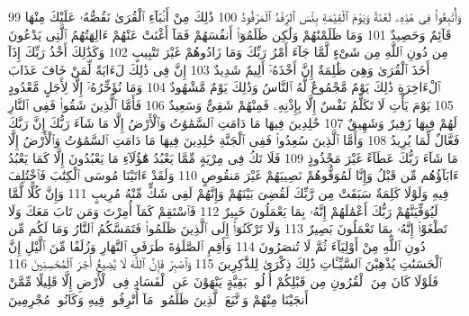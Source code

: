 {\tiny\colorbox{cl_aya}{99}} وَأُتْبِعُوا۟ فِى هَٰذِهِۦ لَعْنَةً وَيَوْمَ ٱلْقِيَٰمَةِ بِئْسَ ٱلرِّفْدُ ٱلْمَرْفُودُ
{\tiny\colorbox{cl_aya}{100}} ذَٰلِكَ مِنْ أَنۢبَآءِ ٱلْقُرَىٰ نَقُصُّهُۥ عَلَيْكَ مِنْهَا قَآئِمٌ وَحَصِيدٌ
{\tiny\colorbox{cl_aya}{101}} وَمَا ظَلَمْنَٰهُمْ وَلَٰكِن ظَلَمُوٓا۟ أَنفُسَهُمْ فَمَآ أَغْنَتْ عَنْهُمْ ءَالِهَتُهُمُ ٱلَّتِى يَدْعُونَ مِن دُونِ ٱللَّهِ مِن شَىْءٍ لَّمَّا جَآءَ أَمْرُ رَبِّكَ وَمَا زَادُوهُمْ غَيْرَ تَتْبِيبٍ
{\tiny\colorbox{cl_aya}{102}} وَكَذَٰلِكَ أَخْذُ رَبِّكَ إِذَآ أَخَذَ ٱلْقُرَىٰ وَهِىَ ظَٰلِمَةٌ إِنَّ أَخْذَهُۥٓ أَلِيمٌ شَدِيدٌ
{\tiny\colorbox{cl_aya}{103}} إِنَّ فِى ذَٰلِكَ لَءَايَةً لِّمَنْ خَافَ عَذَابَ ٱلْءَاخِرَةِ ذَٰلِكَ يَوْمٌ مَّجْمُوعٌ لَّهُ ٱلنَّاسُ وَذَٰلِكَ يَوْمٌ مَّشْهُودٌ
{\tiny\colorbox{cl_aya}{104}} وَمَا نُؤَخِّرُهُۥٓ إِلَّا لِأَجَلٍ مَّعْدُودٍ
{\tiny\colorbox{cl_aya}{105}} يَوْمَ يَأْتِ لَا تَكَلَّمُ نَفْسٌ إِلَّا بِإِذْنِهِۦ فَمِنْهُمْ شَقِىٌّ وَسَعِيدٌ
{\tiny\colorbox{cl_aya}{106}} فَأَمَّا ٱلَّذِينَ شَقُوا۟ فَفِى ٱلنَّارِ لَهُمْ فِيهَا زَفِيرٌ وَشَهِيقٌ
{\tiny\colorbox{cl_aya}{107}} خَٰلِدِينَ فِيهَا مَا دَامَتِ ٱلسَّمَٰوَٰتُ وَٱلْأَرْضُ إِلَّا مَا شَآءَ رَبُّكَ إِنَّ رَبَّكَ فَعَّالٌ لِّمَا يُرِيدُ
{\tiny\colorbox{cl_aya}{108}} وَأَمَّا ٱلَّذِينَ سُعِدُوا۟ فَفِى ٱلْجَنَّةِ خَٰلِدِينَ فِيهَا مَا دَامَتِ ٱلسَّمَٰوَٰتُ وَٱلْأَرْضُ إِلَّا مَا شَآءَ رَبُّكَ عَطَآءً غَيْرَ مَجْذُوذٍ
{\tiny\colorbox{cl_aya}{109}} فَلَا تَكُ فِى مِرْيَةٍ مِّمَّا يَعْبُدُ هَٰٓؤُلَآءِ مَا يَعْبُدُونَ إِلَّا كَمَا يَعْبُدُ ءَابَآؤُهُم مِّن قَبْلُ وَإِنَّا لَمُوَفُّوهُمْ نَصِيبَهُمْ غَيْرَ مَنقُوصٍ
{\tiny\colorbox{cl_aya}{110}} وَلَقَدْ ءَاتَيْنَا مُوسَى ٱلْكِتَٰبَ فَٱخْتُلِفَ فِيهِ وَلَوْلَا كَلِمَةٌ سَبَقَتْ مِن رَّبِّكَ لَقُضِىَ بَيْنَهُمْ وَإِنَّهُمْ لَفِى شَكٍّ مِّنْهُ مُرِيبٍ
{\tiny\colorbox{cl_aya}{111}} وَإِنَّ كُلًّا لَّمَّا لَيُوَفِّيَنَّهُمْ رَبُّكَ أَعْمَٰلَهُمْ إِنَّهُۥ بِمَا يَعْمَلُونَ خَبِيرٌ
{\tiny\colorbox{cl_aya}{112}} فَٱسْتَقِمْ كَمَآ أُمِرْتَ وَمَن تَابَ مَعَكَ وَلَا تَطْغَوْا۟ إِنَّهُۥ بِمَا تَعْمَلُونَ بَصِيرٌ
{\tiny\colorbox{cl_aya}{113}} وَلَا تَرْكَنُوٓا۟ إِلَى ٱلَّذِينَ ظَلَمُوا۟ فَتَمَسَّكُمُ ٱلنَّارُ وَمَا لَكُم مِّن دُونِ ٱللَّهِ مِنْ أَوْلِيَآءَ ثُمَّ لَا تُنصَرُونَ
{\tiny\colorbox{cl_aya}{114}} وَأَقِمِ ٱلصَّلَوٰةَ طَرَفَىِ ٱلنَّهَارِ وَزُلَفًا مِّنَ ٱلَّيْلِ إِنَّ ٱلْحَسَنَٰتِ يُذْهِبْنَ ٱلسَّيِّـَٔاتِ ذَٰلِكَ ذِكْرَىٰ لِلذَّٰكِرِينَ
{\tiny\colorbox{cl_aya}{115}} وَٱصْبِرْ فَإِنَّ ٱللَّهَ لَا يُضِيعُ أَجْرَ ٱلْمُحْسِنِينَ
{\tiny\colorbox{cl_aya}{116}} فَلَوْلَا كَانَ مِنَ ٱلْقُرُونِ مِن قَبْلِكُمْ أُو۟لُوا۟ بَقِيَّةٍ يَنْهَوْنَ عَنِ ٱلْفَسَادِ فِى ٱلْأَرْضِ إِلَّا قَلِيلًا مِّمَّنْ أَنجَيْنَا مِنْهُمْ وَٱتَّبَعَ ٱلَّذِينَ ظَلَمُوا۟ مَآ أُتْرِفُوا۟ فِيهِ وَكَانُوا۟ مُجْرِمِينَ
